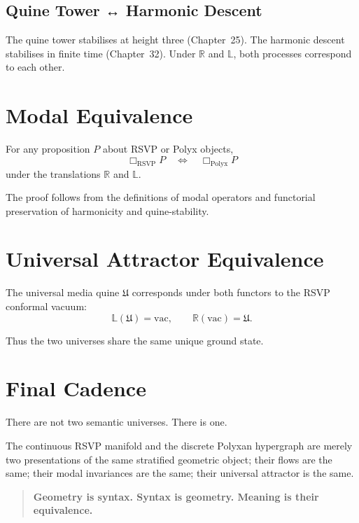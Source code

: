 \subsection{Quine Tower ↔ Harmonic Descent}

The quine tower stabilises at height three (Chapter~25).  
The harmonic descent stabilises in finite time (Chapter~32).  
Under $\mathbb{R}$ and $\mathbb{L}$, both processes correspond to each other.



\section{Modal Equivalence}

\begin{theorem}
For any proposition $P$ about RSVP or Polyx objects,
\[
\Box_{\mathrm{RSVP}} P 
\quad\Longleftrightarrow\quad
\Box_{\mathrm{Polyx}} P
\]
under the translations $\mathbb{R}$ and $\mathbb{L}$.
\end{theorem}

The proof follows from the definitions of modal operators and functorial
preservation of harmonicity and quine-stability.



\section{Universal Attractor Equivalence}

\begin{theorem}
The universal media quine $\mathfrak{U}$ corresponds under both functors to the
RSVP conformal vacuum:
\[
\mathbb{L}(\mathfrak{U}) = \mathrm{vac},
\qquad
\mathbb{R}(\mathrm{vac}) = \mathfrak{U}.
\]
\end{theorem}

Thus the two universes share the same unique ground state.



\section{Final Cadence}

There are not two semantic universes.  
There is one.

The continuous RSVP manifold and the discrete Polyxan hypergraph are merely two
presentations of the same stratified geometric object; their flows are the same;
their modal invariances are the same; their universal attractor is the same.

\begin{quote}
\textbf{Geometry is syntax.  
Syntax is geometry.  
Meaning is their equivalence.}
\end{quote}

